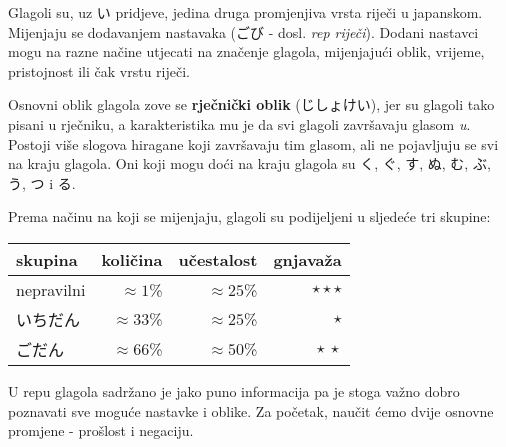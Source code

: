 
\author{Tomislav Mamić}

	
	
	Glagoli su, uz い pridjeve, jedina druga promjenjiva vrsta riječi u japanskom. Mijenjaju se dodavanjem nastavaka (ごび - dosl. \textit{rep riječi}). Dodani nastavci mogu na razne načine utjecati na značenje glagola, mijenjajući oblik, vrijeme, pristojnost ili čak vrstu riječi.
	
	Osnovni oblik glagola zove se \textbf{rječnički oblik} (じしょけい), jer su glagoli tako pisani u rječniku, a karakteristika mu je da svi glagoli završavaju glasom \textit{u}. Postoji više slogova hiragane koji završavaju tim glasom, ali ne pojavljuju se svi na kraju glagola. Oni koji mogu doći na kraju glagola su く, ぐ, す, ぬ, む, ぶ, う, つ i る.
	
	Prema načinu na koji se mijenjaju, glagoli su podijeljeni u sljedeće tri skupine:
	
	\begin{table}[h]
		\centering
		\begin{tabular}{l r r r}\toprule[2pt]
			skupina & količina & učestalost & gnjavaža\\
			\midrule
			nepravilni & $\approx 1$\% & $\approx 25$\% & $\star\star\star$\\
			いちだん\footnotemark[1] & $\approx 33$\% & $\approx 25$\% & $\star$\\
			ごだん\footnotemark[1] & $\approx 66$\% & $\approx 50$\% & $\star\:\star$\\
			\bottomrule[2pt]
		\end{tabular}
	\end{table}


	U repu glagola sadržano je jako puno informacija pa je stoga važno dobro poznavati sve moguće nastavke i oblike. Za početak, naučit ćemo dvije osnovne promjene - prošlost i negaciju.
	
	
